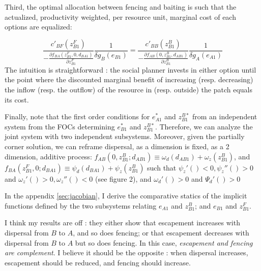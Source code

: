 \documentclass{article}
\begin{document}
Third, the optimal allocation between fencing and baiting is such that the actualized, productivity weighted, per resource unit, marginal cost of each options are equalized: 

$$
\frac{c'_{BF}(z_{B1}^F)}{- \frac{\partial f_{BA}(z_{B1}^F, 0, d_{BA1})}{\partial z_{B1}^F}}\frac{1}{\delta g_{B}(e_{B1})} = \frac{c'_{BB}(z_{B1}^B)}{- \frac{\partial f_{AB}(0, z_{B1}^B, d_{AB1})}{\partial z_{B1}^B}}\frac{1}{\delta g_{A}(e_{A1})}
$$
The intuition is straightforward : the social planner invests in either option until the point where the discounted marginal benefit of increasing (resp. decreasing) the inflow (resp. the outflow) of the resource in (resp. outside) the patch equals its cost.

Finally, note that the first order conditions for $e_{A1}^*$ and $z_{B1}^{B*}$ from an independent system from the FOCs determining $e_{B1}^*$ and $z_{B1}^{B*}$. Therefore, we can analyze the joint system with two independent subsystems. Moreover, given the partially corner solution, we can reframe dispersal, as a dimension is fixed, as a 2 dimension, additive process: $f_{AB}(0, z_{B1}^B; d_{AB1}) \equiv \omega_d(d_{AB1}) + \omega_z \left(z_{B1}^B \right)$, and $f_{BA}(z_{B1}^F, 0 ; d_{BA1}) \equiv \psi_d(d_{BA1}) + \psi_z \left(z_{B1}^B \right)$ such that $\psi_z'()<0, \psi_z''()>0$ and $\omega_z'()>0, \omega_z''()<0$ (see figure 2), and $\omega_d'()>0$ and $\Psi_d'()>0$

In the appendix \ref{sec:jacobian}, I derive the comparative statics of the implicit functions defined by the two subsystems relating $e_{A1}$ and $z_{B1}^B$; and $e_{B1}$ and $z_{B1}^F$.

I think my results are off : they either show that escapement increases with dispersal from $B$ to $A$, and so does fencing; or that escapement decreases with dispersal from $B$ to $A$ but so does fencing. In this case, \textit{escapement and fencing are complement}. I believe it should be the opposite : when dispersal increases, escapement should be reduced, and fencing should increase. 
\end{document}
